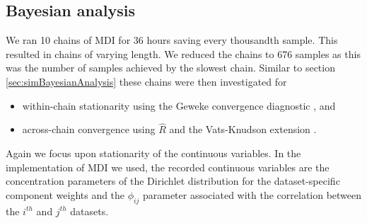 \documentclass[]{article}
\begin{document}
\subsection{Bayesian analysis} \label{sec:yeastBayesianAnalysis}
We ran 10 chains of MDI for 36 hours saving every thousandth sample. This resulted in chains of varying length. We reduced the chains to 676 samples as this was the number of samples achieved by the slowest chain. Similar to section \ref{sec:simBayesianAnalysis} these chains were then investigated for 
\begin{itemize}
	\item within-chain stationarity using the Geweke convergence diagnostic \citep{geweke1991evaluating}, and
	\item across-chain convergence using $\hat{R}$ \citep{gelman1992inference} and the Vats-Knudson extension \citep[\emph{stable $\hat{R}$},][]{vats2018revisiting}.
\end{itemize}
%
%
Again we focus upon stationarity of the continuous variables. In the implementation of MDI we used, the recorded continuous variables are the concentration parameters of the Dirichlet distribution for the dataset-specific component weights and the $\phi_{ij}$ parameter associated with the correlation between the $i^{th}$ and $j^{th}$ datasets. 
\end{document}
